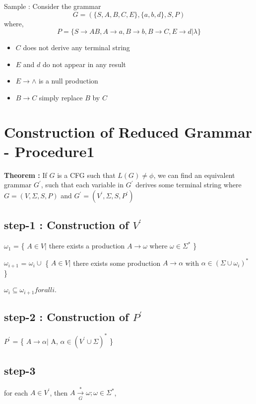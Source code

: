 \documentclass[12pt]{book}
\begin{document}
Sample : Consider the grammar $$G=(\{S,A,B,C,E\},\{a,b,d\},S,P)$$
where,
$$
P = \{ S \to AB, A \to a , B \to b, B \to C, E \to d | \lambda \}
$$

\begin{itemize}
	\item $C$ does not derive any terminal string
	\item $E$ and $d$ do not appear in any result
	\item $E \to \wedge$ is a null production
	\item $B \to C$ simply replace $B$ by $C$
\end{itemize}

\section{Construction of Reduced Grammar - Procedure1}

\textbf{Theorem : } If $G$ is a CFG such that $L(G) \neq \phi$, we can find an equivalent grammar $G^{\prime}$, such that each variable in $G^{\prime}$ derives some terminal string where $G=(V, \Sigma, S, P)$ and $G^{\prime} = (V^{\prime} , \Sigma, S , P^{\prime})$


\subsection{step-1 : Construction of $V^{\prime}$}

$\omega_{1}$ = \{ $A \in V | $ there exists a production $A \to \omega$ where $\omega \in \Sigma^{*}$  \}

$\omega_{i+1}$ = $\omega_{i} \cup $ \{ $A \in V | $ there exists some production $A \to \alpha$ with $\alpha \in (\Sigma \cup \omega_{i})^{*}$ \} 


$\omega_{i} \subseteq \omega_{i+1} for all i . $


\subsection{step-2 : Construction of $P^{\prime}$}

$P^{\prime}$ = \{ $A \to \alpha | $ A, $ \alpha \in (V^{\prime} \cup \Sigma)^{*}$  \}

\subsection{step-3}

for each $A \in V^{\prime}$, then $A \xrightarrow[G]{*} \omega ; \omega \in \Sigma^{*}$,
\end{document}
